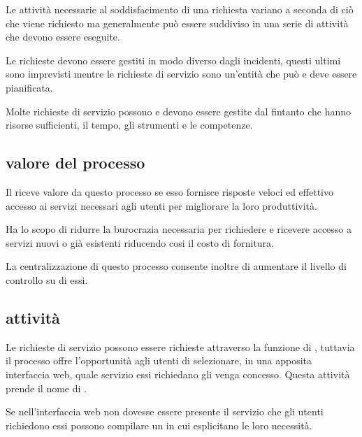 Le attività necessarie al soddisfacimento di una richiesta variano a seconda di ciò che viene richiesto ma generalmente può essere suddiviso in una serie di attività che devono essere eseguite.

Le richieste devono essere gestiti in modo diverso dagli incidenti, questi ultimi sono imprevisti mentre le richieste di servizio sono un'entità che può e deve essere pianificata.

Molte richieste di servizio possono e devono essere gestite dal  fintanto che hanno risorse sufficienti, il tempo, gli strumenti e le competenze.

\subsection[Valore del processo]{valore del processo}
\label{prc-request-value}
Il  riceve valore da questo processo se esso fornisce risposte veloci ed effettivo accesso ai servizi necessari agli utenti per migliorare la loro produttività.

Ha lo scopo di ridurre la burocrazia necessaria per richiedere e ricevere accesso a servizi nuovi o già esistenti riducendo cosi il costo di fornitura.

La centralizzazione di questo processo consente inoltre di aumentare il livello di controllo su di essi.

\subsection[attività]{attività}
\label{prc-request-activities}
Le richieste di servizio possono essere richieste attraverso la funzione di , tuttavia il processo offre l'opportunità agli utenti di selezionare, in una apposita interfaccia web, quale servizio essi richiedano gli venga concesso. Questa attività prende il nome di .

Se nell'interfaccia web non dovesse essere presente il servizio che gli utenti richiedono essi possono compilare un  in cui esplicitano le loro necessità.

